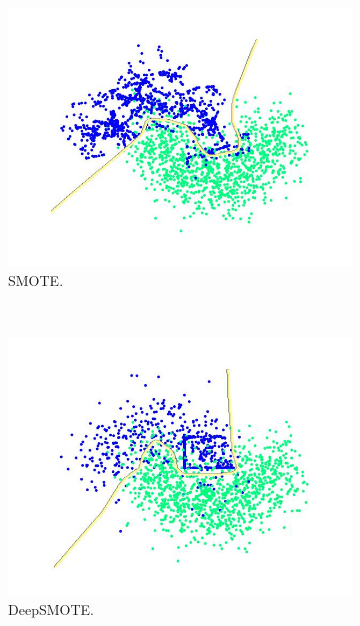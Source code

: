 \begin{figure}[th]
\begin{subfigure}[]{0.3\linewidth}
		\includegraphics[width=\linewidth]{Figures/moon/Training_Data_PLot_SMOTE}
		\caption{SMOTE.}
		\label{fig:smote_moon}
	\end{subfigure}
	\\
	\begin{subfigure}[]{0.3\linewidth}
		\includegraphics[width=\linewidth]{Figures/moon/Training_Data_PLot_DeepSMOTE}
		\caption{ DeepSMOTE.}
		\label{fig:deepsmote_moon}
	\end{subfigure}
	\hspace{0.1em}%
	\begin{subfigure}[]{0.3\linewidth}

\end{subfigure}
\end{figure}
